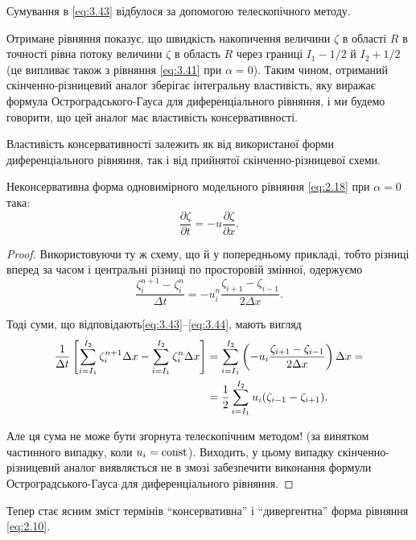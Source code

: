 \begin{remark}
    Сумування в \eqref{eq:3.43} відбулося за допомогою телескопічного методу.
\end{remark}
 
Отримане рівняння показує, що швидкість накопичення величини $\zeta$ в області $R$ в точності рівна потоку величини $\zeta$ в область $R$ через границі $I_1 - 1/2$ й $I_2 + 1/2$ (це випливає також з рівняння \eqref{eq:3.41} при $\alpha = 0$). Таким чином, отриманий скінченно-різницевий аналог зберігає інтегральну властивість, яку виражає формула Остроградського-Гауса для диференціального рівняння, і ми будемо говорити, що цей аналог має властивість консервативності. \medskip

Властивість консервативності залежить як від використаної форми диференціального рівняння, так і від прийнятої скінченно-різницевої схеми. 

\begin{example}
    Неконсервативна форма одновимірного модельного рівняння \eqref{eq:2.18} при $\alpha = 0$ така:
    \begin{equation}
        \label{eq:3.45}
        \frac{\partial \zeta}{\partial t} = - u \frac{\partial \zeta}{\partial x}.
    \end{equation}
\end{example}
\begin{proof}
    Використовуючи ту ж схему, що й у попередньому прикладі, тобто різниці вперед за часом і центральні різниці по просторовій змінної, одержуємо
    \begin{equation}
        \label{eq:3.46}
        \frac{\zeta_i^{n + 1} - \zeta_i^n}{\Delta t} = - u_i^n \frac{\zeta_{i + 1} - \zeta_{i - 1}}{2 \Delta x}.
    \end{equation}

    Тоді суми, що відповідають\eqref{eq:3.43}--\eqref{eq:3.44}, мають вигляд
    \begin{equation}
        \label{eq:3.47}
        \begin{aligned}
            \frac{1}{\Delta t} \left[ \sum_{i = I_1}^{I_2} \zeta_i^{n + 1} \Delta x - \sum_{i = I_1}^{I_2} \zeta_i^n \Delta x \right] &= \sum_{i = I_1}^{I_2} \left( - u_i \frac{\zeta_{i + 1} - \zeta_{i - 1}}{2 \Delta x} \right) \Delta x = \\
            &= \frac{1}{2} \sum_{i = I_1}^{I_2} u_i (\zeta_{i - 1} - \zeta_{i + 1}).
        \end{aligned}
    \end{equation}
    
    Але ця сума не може бути згорнута телескопічним методом! (за винятком частинного випадку, коли $u_i = \operatorname{const}$). Виходить, у цьому випадку скінченно-різницевий аналог виявляється не в змозі забезпечити виконання формули Остроградського-Гауса для диференціального рівняння. 
\end{proof}
\begin{remark}
    Тепер стає ясним зміст термінів ``консервативна'' і ``дивергентна'' форма рівняння \eqref{eq:2.10}.
\end{remark}

